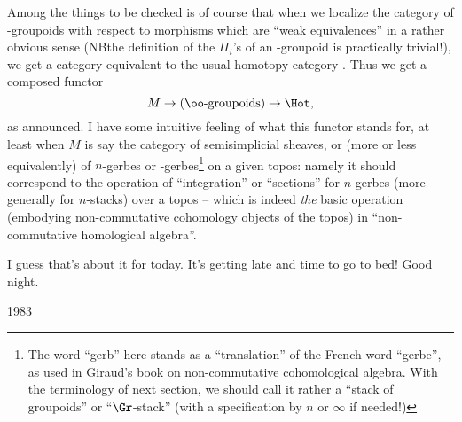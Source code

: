 Among the things to be checked is of course that when we localize the
category of \oo-groupoids with respect to morphisms which are ``weak
equivalences'' in a rather obvious sense (NB\enspace the definition of the
$\Pi_i$'s of an \oo-groupoid is practically trivial!), we get a
category equivalent to the usual homotopy category \Hot. Thus we get a
composed functor
\[ M \to (\text{\oo-groupoids}) \to \Hot,\]
as announced. I have some intuitive feeling of what this functor
stands for, at least when $M$ is say the category of semisimplicial
sheaves, or (more or less equivalently) of $n$-gerbes or \oo-gerbes\footnote{The word ``gerb'' here stands as a ``translation'' of the French word ``gerbe'', as used in Giraud's book on non-commutative cohomological algebra. With the terminology of next section, we should call it rather a ``stack of groupoids'' or ``$\Gr$-stack'' (with a specification by $n$ or $\infty$ if needed!)} on
a given topos: namely it should correspond to the operation of
``integration'' or ``sections'' for $n$-gerbes (more generally for
$n$-stacks) over a topos -- which is indeed \emph{the} basic operation
(embodying non-commutative cohomology objects of the topos) in
``non-commutative homological algebra''.

I guess that's about it for today. It's getting late and time to go to
bed! Good night.

\newpage 

\presectionfill{}1983\par

